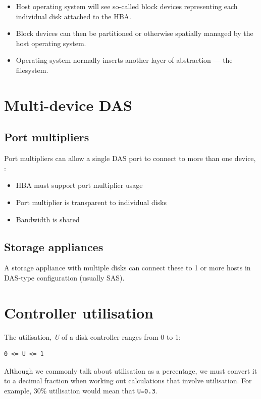 \begin{itemize}
\item
  Host operating system will see so-called block devices representing
  each individual disk attached to the HBA.
\item
  Block devices can then be partitioned or otherwise spatially managed
  by the host operating system.
\item
  Operating system normally inserts another layer of abstraction --- the
  filesystem.
\end{itemize}

\section{Multi-device DAS}\label{multi-device-das}

\subsection{Port multipliers}\label{port-multipliers}

Port multipliers can allow a single DAS port to connect to more than one
device, :

\begin{itemize}
\item
  HBA must support port multiplier usage
\item
  Port multiplier is transparent to individual disks
\item
  Bandwidth is shared
\end{itemize}

\subsection{Storage appliances}\label{storage-appliances}

A storage appliance with multiple disks can connect these to 1 or more
hosts in DAS-type configuration (usually SAS).

\section{Controller utilisation}\label{controller-utilisation}

The utilisation, {\emph{U}} of a disk controller ranges from 0 to 1:

\begin{verbatim}
0 <= U <= 1
\end{verbatim}

Although we commonly talk about utilisation as a percentage, we must
convert it to a decimal fraction when working out calculations that
involve utilisation. For example, 30\% utilisation would mean that
\texttt{U=0.3}.

